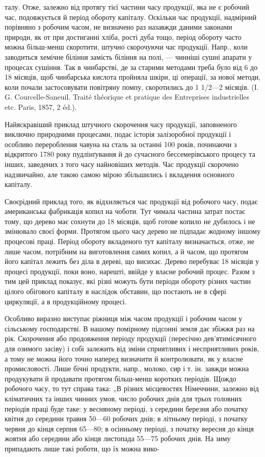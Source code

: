 талу. Отже, залежно від протягу тієї частини часу продукції, яка не є
робочий час, подовжується й період обороту капіталу. Оскільки час продукції,
надмірний порівняно з робочим часом, не визначено раз назавжди
даними законами природи, як от при достиганні хліба, рості дуба тощо,
період обороту часто можна більш-менш скоротити, штучно скорочуючи
час продукції. Напр., коли заводиться хемічне біління замість біління
на полі, — чинніші сушні апарати у процесах сушіння. Так в чинбарстві,
де за старими методами треба було від 6 до 18 місяців, щоб
чинбарська кислота пройняла шкіри, ці операції, за нової методи, коли
почали застосовувати повітряну помпу, скоротились до 1 1/2—2 місяців.
(I. G. Courcelle-Saneuil. Traité théorique et pratique des Entreprises industrielles
etc. Paris, 1857, 2 éd.).

Найяскравіший приклад штучного скорочення часу продукції, заповненого
виключно природними процесами, подає історія залізоробної
продукції і особливо перероблення чавуна на сталь за останні 100 років,
починаючи з відкритого 1780 року пудлінґування й до сучасного бессемерівського
процесу та інших, заведених з того часу найновіших методів.
Час продукції скорочено надзвичайно, але такою самою мірою збільшились
і вкладення основного капіталу.

Своєрідний приклад того, як відхиляється час продукції від робочого
часу, подає американська фабрикація копил на чоботи. Тут чимала частина
затрат постає тому, що дерево має сохнути до 18 місяців, щоб
готове копило не дубилось і не змінювало своєї форми. Протягом цього
часу дерево не підпадає жодному іншому процесові праці. Період обороту
вкладеного тут капіталу визначається, отже, не лише часом, потрібним
на виготовлення самих копил, а й часом, що протягом його капітал
лежить без діла в дереві, що висихає. Дерево перебуває 18 місяців
у процесі продукції, поки воно, нарешті, ввійде у власне робочий процес.
Разом з тим цей приклад показує, які різні можуть бути періоди обороту
різних частин цілого обігового капіталу в наслідок обставин, що постають
не в сфері циркуляції, а в продукційному процесі.

Особливо виразно виступає ріжниця між часом продукції і робочим
часом у сільському господарстві. В нашому помірному підсонні земля дає
збіжжя раз на рік. Скорочення або продовження періоду продукції (пересічно
дев’ятимісячного для озимого засіву) і собі залежить від зміни
сприятливих і несприятливих років, а тому не можна його точно наперед
визначити й контролювати, як у власне промисловості. Лише бічні продукти,
напр., молоко, сир і т. ін. завжди можна продукувати й продавати
протягом більш-менш коротких періодів. Щождо робочого часу, то тут
справа така: „В різних місцевостях Німеччини, залежно від кліматичних
та інших чинних умов, число робочих днів для трьох головних періодів
праці буде таке: у весняному періоді, з середини березня або початку
квітня до середини травня 50—60 робочих днів; в літньому періоді, з початку
червня до кінця серпня 65—80; в осінньому періоді, з початку
вересня до кінця жовтня або середини або кінця листопада 55—75 робочих
днів. На зиму припадають лише такі роботи, що їх можна вико-
